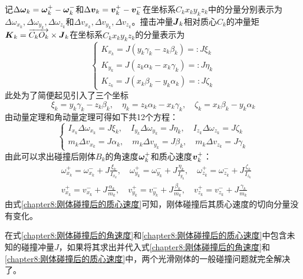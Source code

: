 记$\Delta\boldsymbol{\omega}_k=\boldsymbol{\omega}_k^+-\boldsymbol{\omega}_k^-$和$\Delta\boldsymbol{v}_k=\boldsymbol{v}_k^+-\boldsymbol{v}_k^-$在坐标系$C_kx_ky_kz_k$中的分量分别表示为$\Delta\omega_{x_k},\Delta\omega_{y_k},\Delta\omega_{z_k}$和$\Delta v_{x_k},\Delta v_{y_k},\Delta v_{z_k}$。撞击冲量$\boldsymbol{J}_k$相对质心$C_k$的冲量矩$\boldsymbol{K}_k=\overrightarrow{C_kO_k}\times\boldsymbol{J}_k$在坐标系$C_kx_ky_kz_k$的分量表示为
\begin{equation}
\begin{cases}
	K_{x_k} = J(y_k\gamma_k-z_k\beta_k) =: J\xi_k \\
	K_{y_k} = J(z_k\alpha_k-x_k\gamma_k) =: J\eta_k\\
	K_{z_k} = J(x_k\beta_k-y_k\alpha_k) =: J\zeta_k
\end{cases}
\end{equation}
此处为了简便起见引入了三个坐标
\begin{equation*}
	\xi_k = y_k\gamma_k-z_k\beta_k,\quad \eta_k = z_k\alpha_k-x_k\gamma_k,\quad \zeta_k = x_k\beta_k-y_k\alpha_k
\end{equation*}
由动量定理和角动量定理可得如下共12个方程：
\begin{equation}
\begin{cases}
	I_{x_k}\Delta \omega_{x_k} = J\xi_k,\quad I_{y_k}\Delta \omega_{y_k} = J\eta_k, \quad I_{z_k}\Delta \omega_{z_k} = J\zeta_k \\
	m_k\Delta v_{x_k} = J\alpha_k,\quad m_k\Delta v_{y_k} = J\beta_k,\quad m_k\Delta v_{z_k} = J\gamma_k
\end{cases}
\label{chapter8:刚体碰撞一般问题的动量定理和角动量定理}
\end{equation}
由此可以求出碰撞后刚体$B_k$的角速度$\boldsymbol{\omega}_k^+$和质心速度$\boldsymbol{v}_k^+$：
\begin{align}
	& \omega_{x_k}^+ = \omega_{x_k}^-+J\frac{\xi_k}{I_{x_k}},\quad \omega_{y_k}^+ = \omega_{y_k}^-+J\frac{\eta_k}{I_{y_k}},\quad \omega_{z_k}^+ = \omega_{z_k}^-+J\frac{\zeta_k}{I_{z_k}} \label{chapter8:刚体碰撞后的角速度} \\
	& v_{x_k}^+ = v_{x_k}^-+J\frac{\alpha_k}{m_k},\quad v_{y_k}^+ = v_{y_k}^-+J\frac{\beta_k}{m_k},\quad v_{z_k}^+ = v_{z_k}^-+J\frac{\gamma_k}{m_k} \label{chapter8:刚体碰撞后的质心速度}
\end{align}
由式\eqref{chapter8:刚体碰撞后的质心速度}可知，刚体碰撞后其质心速度的切向分量没有变化。

在式\eqref{chapter8:刚体碰撞后的角速度}和\eqref{chapter8:刚体碰撞后的质心速度}中包含未知的碰撞冲量$J$，如果将其求出并代入式\eqref{chapter8:刚体碰撞后的角速度}和\eqref{chapter8:刚体碰撞后的质心速度}中，两个光滑刚体的一般碰撞问题就完全解决了。

